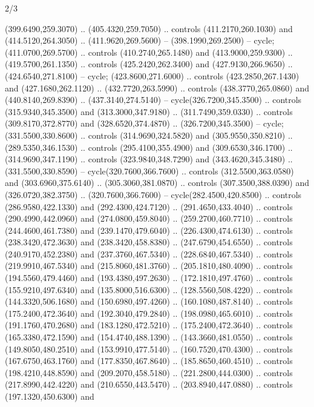 \begin{flagdescription}{2/3}
\begin{scope}[xshift=0.5\flaglength,yshift=0.5\flagwidth,scale=\flagwidth/255]
\begin{scope}[y=-0.43pt, x=0.43pt,xshift=-193pt,yshift=133pt]
\begin{scope}[draw=black,line width=0.003\flagwidth]
\begin{scope}[fill=white]
  (399.6490,259.3070) .. (405.4320,259.7050) .. controls (411.2170,260.1030) and
  (414.5120,264.3050) .. (411.9620,269.5600) -- (398.1990,269.2500) -- cycle;
 (411.0700,269.5700) .. controls (410.2740,265.1480) and
  (413.9000,259.9300) .. (419.5700,261.1350) .. controls (425.2420,262.3400) and
  (427.9130,266.9650) .. (424.6540,271.8100) -- cycle;
 (423.8600,271.6000) .. controls (423.2850,267.1430) and
  (427.1680,262.1120) .. (432.7720,263.5990) .. controls (438.3770,265.0860) and
  (440.8140,269.8390) .. (437.3140,274.5140) -- cycle(326.7200,345.3500) ..
  controls (315.9340,345.3500) and (313.3000,347.9180) .. (311.7490,359.0330) ..
  controls (309.8170,372.8770) and (328.6520,374.4870) .. (326.7200,345.3500) --
  cycle;
 (331.5500,330.8600) .. controls (314.9690,324.5820) and
  (305.9550,350.8210) .. (289.5350,346.1530) .. controls (295.4100,355.4900) and
  (309.6530,346.1700) .. (314.9690,347.1190) .. controls (323.9840,348.7290) and
  (343.4620,345.3480) .. (331.5500,330.8590) -- cycle(320.7600,366.7600) ..
  controls (312.5500,363.0580) and (303.6960,375.6140) .. (305.3060,381.0870) ..
  controls (307.3500,388.0390) and (326.0720,382.3750) .. (320.7600,366.7600) --
  cycle(282.4500,420.8500) .. controls (286.9580,422.1330) and
  (292.4300,424.7120) .. (291.4650,433.4040) .. controls (290.4990,442.0960) and
  (274.0800,459.8040) .. (259.2700,460.7710) .. controls (244.4600,461.7380) and
  (239.1470,479.6040) .. (226.4300,474.6130) .. controls (238.3420,472.3630) and
  (238.3420,458.8380) .. (247.6790,454.6550) .. controls (240.9170,452.2380) and
  (237.3760,467.5340) .. (228.6840,467.5340) .. controls (219.9910,467.5340) and
  (215.8060,481.3760) .. (205.1810,480.4090) .. controls (194.5560,479.4460) and
  (193.4380,497.2630) .. (172.1810,497.4760) .. controls (155.9210,497.6340) and
  (135.8000,516.6300) .. (128.5560,508.4220) .. controls (144.3320,506.1680) and
  (150.6980,497.4260) .. (160.1080,487.8140) .. controls (175.2400,472.3640) and
  (192.3040,479.2840) .. (198.0980,465.6010) .. controls (191.1760,470.2680) and
  (183.1280,472.5210) .. (175.2400,472.3640) .. controls (165.3380,472.1590) and
  (154.4740,488.1390) .. (143.3660,481.0550) .. controls (149.8050,480.2510) and
  (153.9910,477.5140) .. (160.7520,470.4300) .. controls (167.6750,463.1760) and
  (177.8350,467.8640) .. (185.8650,460.4510) .. controls (198.4210,448.8590) and
  (209.2070,458.5180) .. (221.2800,444.0300) .. controls (217.8990,442.4220) and
  (210.6550,443.5470) .. (203.8940,447.0880) .. controls (197.1320,450.6300) and

\end{scope}
\end{scope}
\end{scope}
\end{scope}
\end{flagdescription}
